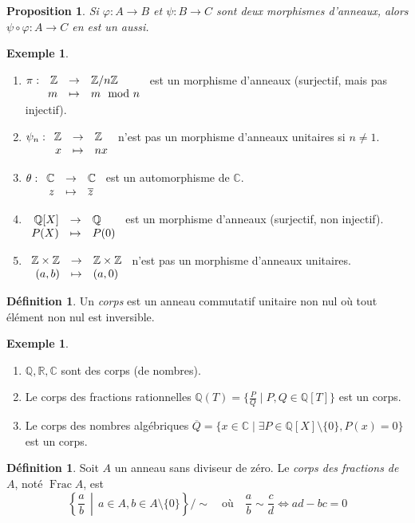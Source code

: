 \documentclass{article}
\newcommand{\Z}{\mathbb{Z}}
\newcommand{\Q}{\mathbb{Q}}
\newcommand{\R}{\mathbb{R}}
\newcommand{\C}{\mathbb{C}}
\DeclareMathOperator{\Frac}{Frac}
\newcommand{\midbar}{\, \middle|\,}
\newcommand{\applic}[4]{\begin{array}[t]{rcl}
#1 & \to & #2 \\
#3 & \mapsto & #4
\end{array}}
\theoremstyle{plain}
\newtheorem{proposition}[theorem]{Proposition}
\theoremstyle{definition}
\newtheorem{definition}[theorem]{Définition}
\newtheorem{example}[theorem]{Exemple}
\theoremstyle{remark}
\begin{document}
\begin{proposition}
    Si $\varphi : A \to B$ et $\psi : B \to C$ sont deux morphismes d'anneaux, alors $\psi \circ \varphi : A \to C$ en est un aussi.
\end{proposition}

\begin{example} \leavevmode
    \begin{enumerate}
        \item $\pi : \applic{\Z}{\Z/n\Z}{m}{m \mod n}$ est un morphisme d'anneaux (surjectif, mais pas injectif).
        \item $\psi_n : \applic{\Z}{\Z}{x}{nx}$ n'est pas un morphisme d'anneaux unitaires si $n \ne 1$.
        \item $\theta : \applic{\C}{\C}{z}{\overline{z}}$ est un automorphisme de $\C$.
        \item $\applic{\Q[X]}{\Q}{P(X)}{P(0)}$ est un morphisme d'anneaux (surjectif, non injectif).
        \item $\applic{\Z\times\Z}{\Z\times\Z}{(a,b)}{(a,0)}$ n'est pas un morphisme d'anneaux unitaires.
    \end{enumerate}
\end{example}

\begin{definition}
    Un \emph{corps} est un anneau commutatif unitaire non nul où tout élément non nul est inversible.
\end{definition}

\begin{example} \leavevmode
    \begin{enumerate}
        \item $\Q,\R,\C$ sont des corps (de nombres).
        \item Le corps des fractions rationnelles $\Q(T) = \{\frac{P}{Q} \mid P,Q \in \Q[T]\}$ est un corps.
        \item Le corps des nombres algébriques $\overline{Q} = \{x \in \C \mid \exists P \in \Q[X] \setminus\{0\}, P(x) = 0\}$ est un corps.
    \end{enumerate}
\end{example}

\begin{definition}
    Soit $A$ un anneau sans diviseur de zéro. Le \emph{corps des fractions de $A$}, noté $\Frac A$, est
    \[\left\{\frac{a}{b} \midbar a \in A, b \in A\setminus\{0\}\right\}/\sim \quad \text{où} \quad \frac{a}{b} \sim \frac{c}{d} \iff ad-bc = 0\]
\end{definition}
\end{document}

